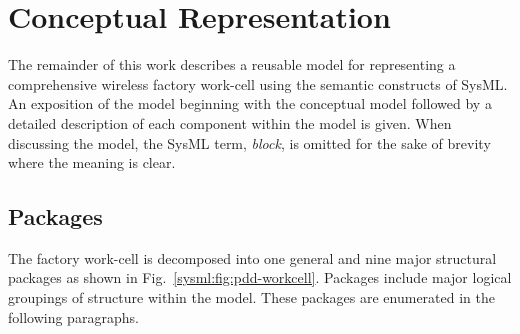 %

\section{Conceptual Representation} \label{sysml:sec:conceptual}
The remainder of this work describes a reusable model for representing a comprehensive wireless factory work-cell using the semantic constructs of SysML.  An exposition of the model beginning with the conceptual model followed by a detailed description of each component within the model is given. When discussing the model, the SysML term, \textit{block}, is omitted for the sake of brevity where the meaning is clear. 

\subsection{Packages}
The factory work-cell is decomposed into one general and nine major structural packages as shown in Fig.~\ref{sysml:fig:pdd-workcell}.  Packages include major logical groupings of structure within the model.  These packages are enumerated in the following paragraphs.

